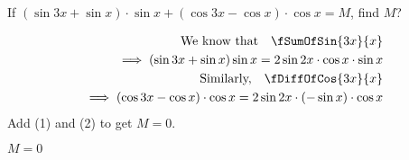 

\question[3] If $\left( \sin 3x + \sin x\right)\cdot \sin x + 
  \left(\cos 3x - \cos x \right)\cdot\cos x = M$, find $M$?

\begin{solution}[\halfpage]
	\begin{align}
	    \text{We know that}\quad
		\fSumOfSin{3x}{x} \nonumber \\
		\implies (\sin 3x + \sin x)\sin x 
			= 2\sin{2x}\cdot\cos{x}\cdot\sin{x}\\
	    \text{Similarly,}\quad
		\fDiffOfCos{3x}{x} \nonumber \\
		\implies (\cos 3x-\cos x)\cdot\cos x 
			= 2\sin{2x}\cdot(-\sin x)\cdot\cos x
	\end{align}
	Add (1) and (2) to get $M=0$.
\end{solution}

\ifprintanswers\begin{codex}$M=0$\end{codex}\fi

